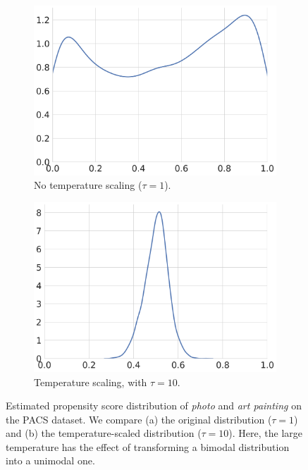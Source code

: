 \begin{figure}[ht!]
     \centering
     \begin{subfigure}[b]{0.49\textwidth}
         \centering
         \includegraphics[scale=0.2]{figures/ps_photo_artpainting_temp1.png}
         \caption{No temperature scaling ($\tau=1$).}
     \end{subfigure}
     \hfill
     \begin{subfigure}[b]{0.49\textwidth}
         \centering
         \includegraphics[scale=0.2]{figures/ps_photo_artpainting_temp10.png}
         \caption{Temperature scaling, with $\tau=10$.}
     \end{subfigure}
    \caption{Estimated propensity score distribution of \textit{photo} and \textit{art painting} on the PACS dataset. We compare (a) the original distribution ($\tau=1$) and (b) the temperature-scaled distribution ($\tau=10$).
    Here, the large temperature has the effect of transforming a bimodal distribution into a unimodal one.}
    \label{fig:pacs_ps_pa}
\end{figure}
